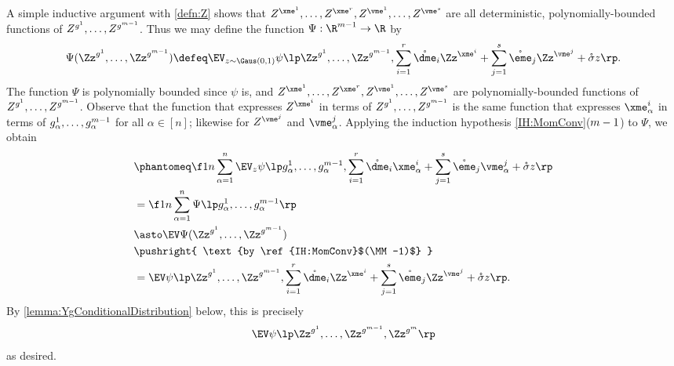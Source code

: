 \documentclass[main.tex]{subfiles}
\begin{document}
A simple inductive argument with \cref{defn:Z} shows that $Z^{\xme^1}, \ldots, Z^{\xme^r}, Z^{\vme^1}, \ldots, Z^{\vme^s}$ are all deterministic, polynomially-bounded functions of $Z^{g^1}, \ldots, Z^{g^{m-1}}$.
Thus we may define the function $\Psi: \R^{\MM-1} \to \R$ by
\[
\Psi(\Zz^{g^1}, \ldots, \Zz^{g^{\MM-1}})
  \defeq
    \EV_{z \sim \Gaus(0, 1)}
      \psi\lp \Zz^{g^1}, \ldots, \Zz^{g^{\MM-1}},
        \sum_{i=1}^r \mathring{\dme}_i \Zz^{\xme^i}
        + \sum_{j=1}^s \mathring{\eme}_j \Zz^{\vme^j}
        + \mathring \sigma z
      \rp
      .
\]
The function $\Psi$ is polynomially bounded since $\psi$ is, and
$Z^{\xme^1}, \ldots, Z^{\xme^r}, Z^{\vme^1}, \ldots, Z^{\vme^s}$ are  polynomially-bounded functions of $Z^{g^1}, \ldots, Z^{g^{m-1}}$.
Observe that the function that expresses $Z^{\xme^i}$ in terms of $Z^{g^1}, \ldots, Z^{g^{m-1}}$ is the same function that expresses $\xme^i_\alpha$ in terms of $g^1_\alpha, \ldots, g^{m-1}_\alpha$ for all $\alpha \in[n]$; likewise for $Z^{\vme^j}$ and $\vme^j_\alpha$.
Applying the induction hypothesis \ref{IH:MomConv}($m-1$) to $\Psi$, we obtain
\begin{align*}
    &\phantomeq
        \f 1 n \sum_{\alpha = 1}^n
            \EV_z
                {
                    \psi\lp
                        g^1_\alpha, \ldots, g^{\MM-1}_\alpha,
                        \sum_{i=1}^r \mathring {\dme}_i \xme^i_\alpha +
                        \sum_{j=1}^s \mathring {\eme}_j \vme^j_\alpha + \mathring \sigma z
                        \rp
                }
        \\
    &=
        \f 1 n \sum_{\alpha = 1}^n
                {
                    \Psi\lp
                        g^1_\alpha, \ldots, g^{\MM-1}_\alpha
                        \rp
                }
        \\
    &\asto
        \EV \Psi(\Zz^{g^1}, \ldots, \Zz^{g^{\MM-1}})
        \\
    &\pushright{
      \text{by \ref{IH:MomConv}$(\MM-1)$}
      }
        \\
    &=
        \EV
        \psi\lp
          \Zz^{g^1}, \ldots, \Zz^{g^{\MM-1}},
          \sum_{i=1}^r \mathring {\dme}_i \Zz^{\xme^i} +
            \sum_{j=1}^s \mathring {\eme}_j \Zz^{\vme^j} + \mathring \sigma z
          \rp
          .
\end{align*}
By \cref{lemma:YgConditionalDistribution} below, this is precisely
\begin{align*}
\EV \psi\lp
            \Zz^{g^1}, \ldots, \Zz^{g^{\MM-1}}, \Zz^{g^{\MM}}\rp
\end{align*}
as desired.
\end{document}
